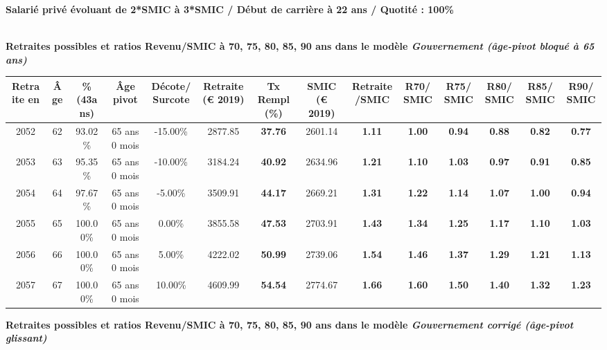 {\bf \noindent Salarié privé évoluant de 2*SMIC à 3*SMIC / Début de carrière à 22 ans / Quotité : 100\%}  ~ 

 ~\\{\bf \noindent Retraites possibles et ratios Revenu/SMIC à 70, 75, 80, 85, 90 ans dans le modèle \emph{Gouvernement (âge-pivot bloqué à 65 ans)}}  
 
\begin{adjustbox}{max width=\textwidth} 
\begin{tabular}[htb]{|c|c||c|c|c||c|c||c|c||c|c|c|c|c|} 
\hline 
 Retraite en &  Âge &  \%(43ans) &  Âge pivot &  Décote/Surcote &  Retraite (\euro{} 2019) &  Tx Rempl(\%) &  SMIC (\euro{} 2019) &  Retraite/SMIC &  R70/SMIC &  R75/SMIC &  R80/SMIC &  R85/SMIC &  R90/SMIC \\ 
\hline \hline 
 2052 &  62 &  93.02\% &  65 ans 0 mois &  -15.00\% &  2877.85 &  {\bf 37.76} &  2601.14 &  {\bf 1.11} &  {\bf {\color{red} 1.00}} &  {\bf {\color{red} 0.94}} &  {\bf {\color{red} 0.88}} &  {\bf {\color{red} 0.82}} &  {\bf {\color{red} 0.77}} \\ 
\hline 
 2053 &  63 &  95.35\% &  65 ans 0 mois &  -10.00\% &  3184.24 &  {\bf 40.92} &  2634.96 &  {\bf 1.21} &  {\bf 1.10} &  {\bf 1.03} &  {\bf {\color{red} 0.97}} &  {\bf {\color{red} 0.91}} &  {\bf {\color{red} 0.85}} \\ 
\hline 
 2054 &  64 &  97.67\% &  65 ans 0 mois &  -5.00\% &  3509.91 &  {\bf 44.17} &  2669.21 &  {\bf 1.31} &  {\bf 1.22} &  {\bf 1.14} &  {\bf 1.07} &  {\bf 1.00} &  {\bf {\color{red} 0.94}} \\ 
\hline 
 2055 &  65 &  100.00\% &  65 ans 0 mois &  0.00\% &  3855.58 &  {\bf 47.53} &  2703.91 &  {\bf 1.43} &  {\bf 1.34} &  {\bf 1.25} &  {\bf 1.17} &  {\bf 1.10} &  {\bf 1.03} \\ 
\hline 
 2056 &  66 &  100.00\% &  65 ans 0 mois &  5.00\% &  4222.02 &  {\bf 50.99} &  2739.06 &  {\bf 1.54} &  {\bf 1.46} &  {\bf 1.37} &  {\bf 1.29} &  {\bf 1.21} &  {\bf 1.13} \\ 
\hline 
 2057 &  67 &  100.00\% &  65 ans 0 mois &  10.00\% &  4609.99 &  {\bf 54.54} &  2774.67 &  {\bf 1.66} &  {\bf 1.60} &  {\bf 1.50} &  {\bf 1.40} &  {\bf 1.32} &  {\bf 1.23} \\ 
\hline 
\hline 
\end{tabular} 
\end{adjustbox} 
 
 \vspace{0.1cm} 
{\bf \noindent Retraites possibles et ratios Revenu/SMIC à 70, 75, 80, 85, 90 ans dans le modèle \emph{Gouvernement corrigé (âge-pivot glissant)}}  
 
